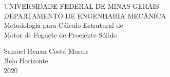 \begin{titlepage}
\centering
UNIVERSIDADE FEDERAL DE MINAS GERAIS \\
DEPARTAMENTO DE ENGENHARIA MECÂNICA\\
{\Large Metodologia para Cálculo Estrutural de \\
Motor de Foguete de Proelente Sólido \\}

Samuel Renan Costa Morais\\
Belo Horizonte\\ 2020

\end{titlepage}